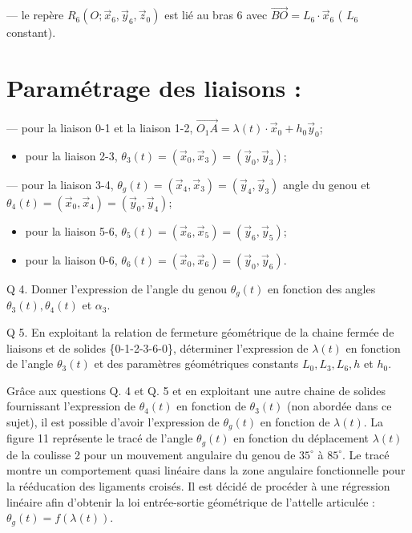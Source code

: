 — le repère $R_{6}\left(O ; \vec{x}_{6}, \vec{y}_{6}, \vec{z}_{0}\right)$ est lié au bras 6 avec $\overrightarrow{B O}=L_{6} \cdot \vec{x}_{6}$ ( $L_{6}$ constant).

\section*{Paramétrage des liaisons :}
— pour la liaison 0-1 et la liaison 1-2, $\overrightarrow{O_{1} A}=\lambda(t) \cdot \vec{x}_{0}+h_{0} \vec{y}_{0}$;

\begin{itemize}
  \item pour la liaison 2-3, $\theta_{3}(t)=\left(\vec{x}_{0}, \vec{x}_{3}\right)=\left(\vec{y}_{0}, \vec{y}_{3}\right)$;
\end{itemize}

— pour la liaison 3-4, $\theta_{g}(t)=\left(\vec{x}_{4}, \vec{x}_{3}\right)=\left(\vec{y}_{4}, \vec{y}_{3}\right)$ angle du genou et $\theta_{4}(t)=\left(\vec{x}_{0}, \vec{x}_{4}\right)=\left(\vec{y}_{0}, \vec{y}_{4}\right)$;

\begin{itemize}
  \item pour la liaison 5-6, $\theta_{5}(t)=\left(\vec{x}_{6}, \vec{x}_{5}\right)=\left(\vec{y}_{6}, \vec{y}_{5}\right)$;

  \item pour la liaison 0-6, $\theta_{6}(t)=\left(\vec{x}_{0}, \vec{x}_{6}\right)=\left(\vec{y}_{0}, \vec{y}_{6}\right)$.

\end{itemize}

Q 4. Donner l'expression de l'angle du genou $\theta_{g}(t)$ en fonction des angles $\theta_{3}(t), \theta_{4}(t)$ et $\alpha_{3}$.

Q 5. En exploitant la relation de fermeture géométrique de la chaine fermée de liaisons et de solides \{0-1-2-3-6-0\}, déterminer l'expression de $\lambda(t)$ en fonction de l'angle $\theta_{3}(t)$ et des paramètres géométriques constants $L_{0}, L_{3}, L_{6}, h$ et $h_{0}$.

Grâce aux questions Q. 4 et Q. 5 et en exploitant une autre chaine de solides fournissant l'expression de $\theta_{4}(t)$ en fonction de $\theta_{3}(t)$ (non abordée dans ce sujet), il est possible d'avoir l'expression de $\theta_{g}(t)$ en fonction de $\lambda(t)$. La figure 11 représente le tracé de l'angle $\theta_{g}(t)$ en fonction du déplacement $\lambda(t)$ de la coulisse 2 pour un mouvement angulaire du genou de $35^{\circ}$ à $85^{\circ}$. Le tracé montre un comportement quasi linéaire dans la zone angulaire fonctionnelle pour la rééducation des ligaments croisés. Il est décidé de procéder à une régression linéaire afin d'obtenir la loi entrée-sortie géométrique de l'attelle articulée : $\theta_{g}(t)=f(\lambda(t))$.

